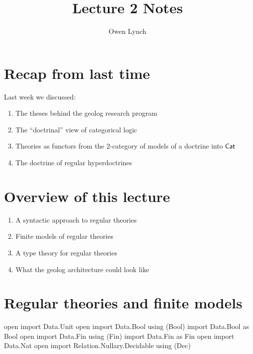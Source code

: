 \documentclass{article}
\begin{document}
\title{Lecture 2 Notes}
\author{Owen Lynch}

\maketitle

\section{Recap from last time}

Last week we discussed:

\begin{enumerate}
  \item The theses behind the geolog research program
  \item The ``doctrinal'' view of categorical logic
  \item Theories as functors from the 2-category of models of a doctrine into $\mathsf{Cat}$
  \item The doctrine of regular hyperdoctrines
\end{enumerate}

\section{Overview of this lecture}

\begin{enumerate}
  \item A syntactic approach to regular theories
  \item Finite models of regular theories
  \item A type theory for regular theories
  \item What the geolog architecture could look like
\end{enumerate}

\section{Regular theories and finite models}

\begin{code}
open import Data.Unit
open import Data.Bool using (Bool)
import Data.Bool as Bool
open import Data.Fin using (Fin)
import Data.Fin as Fin
open import Data.Nat
open import Relation.Nullary.Decidable using (Dec)
\end{code}
\end{document}
